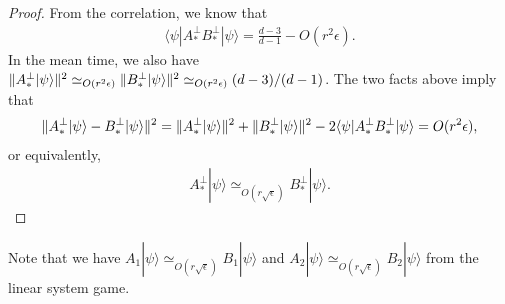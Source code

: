 \documentclass[11pt,letterpaper]{article}
\newcommand{\ket}[1]{|#1\rangle}
\newcommand{\bra}[1]{\langle#1|}
\DeclarePairedDelimiter{\norm}{\lVert}{\rVert}
\DeclareMathOperator{\supp}{supp}
\newcommand{\1}{\mathbb{1}}
\newcommand{\ep}{\epsilon}
\newcommand{\se}{\sqrt{\epsilon}}
\newcommand{\appd}[1]{\simeq_{#1}}
\theoremstyle{definition}
\begin{document}
\begin{proof}
From the correlation, we know that 
\begin{align}
	\bra{\psi} A_\ast^\perp B_\ast^\perp \ket{\psi} = \frac{d-3}{d-1} - O(r^2 \ep).
\end{align}
In the mean time, we also have 
$\norm{A_\ast^\perp \ket{\psi}}^2 \appd{O(r^2\ep)} \norm{B_\ast^\perp\ket{\psi}}^2 \appd{O(r^2\ep)} (d-3)/(d-1)$.
The two facts above imply that 
\begin{align}
	\norm{A_\ast^\perp \ket{\psi} - B_\ast^\perp \ket{\psi}}^2 = \norm{A_\ast^\perp \ket{\psi}}^2 + \norm{B_\ast^\perp \ket{\psi}}^2
	- 2 \bra{\psi} A_\ast^\perp B_\ast^\perp \ket{\psi}  = O(r^2 \ep),
\end{align}
or equivalently,
\begin{align}
	A_\ast^\perp \ket{\psi} \appd{O(r\se)} B_\ast^\perp \ket{\psi}.
\end{align}
\end{proof}

Note that we have $A_1 \ket{\psi} \appd{O(r\se)} B_1 \ket{\psi}$ and $A_2 \ket{\psi} \appd{O(r\se)} B_2 \ket{\psi}$ from the linear
system game.
\end{document}

